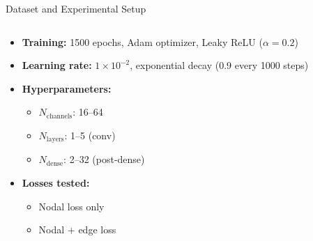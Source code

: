 \documentclass[hyperref={colorlinks,citecolor=blue,linkcolor=blue,urlcolor=blue}]{beamer}
\begin{document}
\begin{frame}{Dataset and Experimental Setup}
\begin{columns}[t,onlytextwidth]
    \begin{column}{0.43\textwidth}
        \scriptsize
        \begin{itemize}
            \item \textbf{Training:} 1500 epochs, Adam optimizer, Leaky ReLU ($\alpha=0.2$)
            \item \textbf{Learning rate:} $1\times10^{-2}$, exponential decay (0.9 every 1000 steps)
            \item \textbf{Hyperparameters:}
            \begin{itemize}
                \scriptsize
                \item $N_{\text{channels}}$: 16–64
                \item $N_{\text{layers}}$: 1–5 (conv)
                \item $N_{\text{dense}}$: 2–32 (post-dense)
            \end{itemize}
            \item \textbf{Losses tested:}
            \begin{itemize}
                \scriptsize
                \item Nodal loss only
                \item Nodal + edge loss
            \end{itemize}
        \end{itemize}
    \end{column}
\end{columns}
\end{frame}
\end{document}
